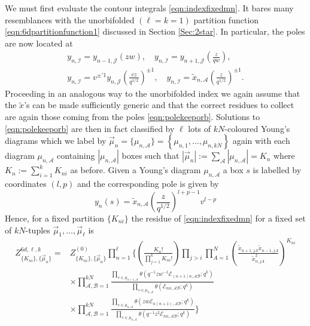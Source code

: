 \documentclass[main.tex]{subfiles}
\begin{document}
We must first evaluate the contour integrals \eqref{eqn:indexfixedmn}. It bares many resemblances with the unorbifolded $(\ell=k=1)$ partition function \eqref{eqn:6dpartitionfunction1} discussed in Section \ref{Sec:2star}. In particular, the poles are now located at
\begin{gather}
y_{n,\mathcal{I}}=y_{n-1,\mathcal{J}}\left(zw\right),\quad y_{n,\mathcal{I}}=y_{n+1,\mathcal{J}}\left(\frac{z}{qw}\right),\\
y_{n,\mathcal{I}}=v^{\pm'1}y_{n,\mathcal{J}}\left(\frac{vz}{q^{1/2}}\right)^{\pm1},\quad  y_{n,\mathcal{I}}=\tilde{x}_{n,\mathcal{A}}\left(\frac{z}{q^{1/2}}\right)^{\pm1}.\label{eqn:polekeeporb}
\end{gather}
Proceeding in an analogous way to the unorbifolded index we again assume that the $\tilde{x}$'s can be made sufficiently generic and that the correct residues to collect are again those coming from the poles \eqref{eqn:polekeeporb}. Solutions to \eqref{eqn:polekeeporb} are then in fact classified by $\ell$ lots of $kN$-coloured Young's diagrams which we label by $\vec{\mu}_n=\{\mu_{n,\mathcal{A}}\}=\left\{\mu_{n,1},\dots,\mu_{n,kN}\right\}$ again with each diagram $\mu_{n,\mathcal{A}}$ containing $|\mu_{n,\mathcal{A}}|$ boxes such that $|\vec{\mu}_n|:=\sum_{\mathcal{A}}|\mu_{n,\mathcal{A}}|=K_n$ where $K_n:=\sum_{i=1}^kK_{ni}$ as before. Given a Young's diagram $\mu_{n,\mathcal{A}}$ a box $s$ is labelled by coordinates $(l,p)$ and the corresponding pole is given by
\begin{equation}
y_n(s)=\tilde{x}_{n,\mathcal{A}}\left(\frac{z}{q^{1/2}}\right)^{l+p-1}v^{l-p}
\end{equation}
Hence, for a fixed partition $\{K_{ni}\}$ the residue of \eqref{eqn:indexfixedmn} for a fixed set of $kN$-tuples $\vec{\mu}_1,\dots,\vec{\mu}_{\ell}$ is
\begin{equation}\label{eqn:Nlkresidue}
\begin{aligned}
Z^{6d,\ell,k}_{\{K_{ni}\},\{\vec{\mu}_n\}}=&Z^{(0)}_{\{K_{ni}\},\{\vec{\mu}_n\}}\prod_{n=1}^{\ell}\Bigg\{\left(\frac{K_n!}{\prod_{j=1}^kK_{ni}!}\right)\prod_{j>i}\prod_{A=1}^N\left(\frac{\tilde{x}_{n+1,jA}\tilde{x}_{n-1,jA}}{\tilde{x}_{n,jA}^2}\right)^{K_{ni}}\\
&\times\prod_{\mathcal{A},\mathcal{B}=1}^{kN}\frac{\prod_{s\in \mu_{n+1,\mathcal{A}}}\theta\left(q^{-1}zw^{-1}\mathcal{E}_{(n+1)n,\mathcal{A}\mathcal{B}};q^k\right)}{\prod_{s\in \mu_{n,\mathcal{A}}}\theta\left(\mathcal{E}_{nn,\mathcal{A}\mathcal{B}};q^k\right)}\\
&\times\prod_{\mathcal{A},\mathcal{B}=1}^{kN}\frac{\prod_{s\in \mu_{n,\mathcal{A}}}\theta\left(zw\mathcal{E}_{n(n+1),\mathcal{A}\mathcal{B}};q^k\right)}{\prod_{s\in \mu_{n,\mathcal{A}}}\theta\left(q^{-1}z^2\mathcal{E}_{nn,\mathcal{A}\mathcal{B}};q^k\right)}\Bigg\}
\end{aligned}
\end{equation}
\end{document}
